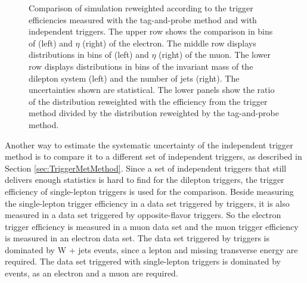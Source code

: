 \begin{figure}[htbp!]
\begin{center}
      \caption{Comparison of \ttbar simulation reweighted according to the trigger efficiencies measured with the tag-and-probe method and with independent \ETm triggers.
       The upper row shows the comparison in bins of \pt (left) and $\eta$ (right) of the electron. The middle row displays distributions in bins of \pt (left) and $\eta$ (right) of the muon. The lower row displays distributions in bins of the invariant mass of the dilepton system (left) and the number of jets (right). The uncertainties shown are statistical. The lower panels show the ratio of the distribution reweighted with the efficiency from the \ETm trigger method divided by the distribution reweighted by the tag-and-probe method. }  
    \label{fig:Clos_emu}
  \end{center}
\end{figure}

Another way to estimate the systematic uncertainty of the independent trigger method is to compare it to a different set of independent triggers, as described in Section \ref{sec:TriggerMetMethod}.
Since a set of independent triggers that still delivers enough statistics is hard to find for the dilepton triggers, the trigger efficiency of single-lepton triggers is used for the comparison.
Beside measuring the single-lepton trigger efficiency in a data set triggered by \ETm triggers, it is also measured in a data set triggered by opposite-flavor triggers.
So the electron trigger efficiency is measured in a muon data set and the muon trigger efficiency is measured in an electron data set.
The data set triggered by \ETm triggers is dominated by W + jets events, since a lepton and missing transverse energy are required.
The data set triggered with single-lepton triggers is dominated by \ttbar events, as an electron and a muon are required.

